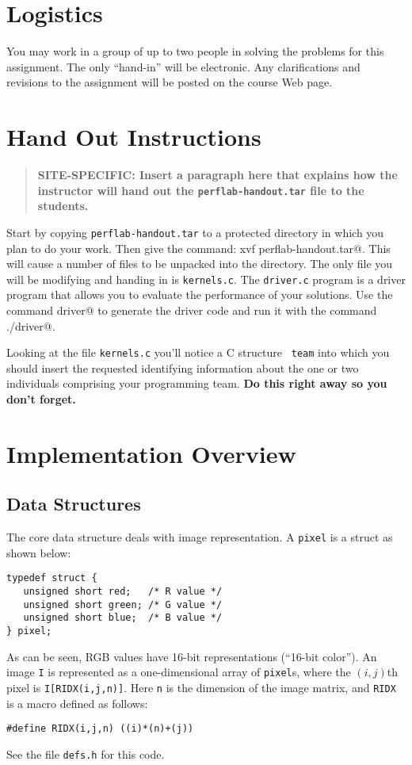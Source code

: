 \documentclass[11pt]{article}
\begin{document}
\section{Logistics}
You may work in a group of up to two people in solving the problems for
this assignment.  The only ``hand-in'' will be electronic.
Any clarifications and revisions to the assignment will be posted on
the course Web page.

\section{Hand Out Instructions} 

\begin{quote}
\bf SITE-SPECIFIC: Insert a paragraph here that explains how the instructor
will hand out the {\tt perflab-handout.tar} file to the students.
\end{quote}

Start by copying \texttt{perflab-handout.tar} to a protected directory
in which you plan to do your work.  Then give the command:
\verb@tar xvf perflab-handout.tar@.  This will cause a number of files
to be unpacked into the directory.  The only file you will be
modifying and handing in is {\tt kernels.c}.  The {\tt driver.c}
program is a driver program that allows you to evaluate the
performance of your solutions. Use the command \verb@make driver@ to
generate the driver code and run it with the command \verb@./driver@.

Looking at the file {\tt kernels.c} you'll notice a C structure {\tt
team} into which you should insert the requested identifying
information about the one or two individuals comprising your
programming team.  {\bf Do this right away so you don't forget.}  


\section{Implementation Overview}
\label{sec:overview}
\subsection*{Data Structures}
The core data structure deals with image representation. A {\tt pixel} is
a struct as shown below:
\small{\begin{verbatim}
typedef struct {
   unsigned short red;   /* R value */
   unsigned short green; /* G value */
   unsigned short blue;  /* B value */
} pixel;
\end{verbatim}}
As can be seen, RGB values have 16-bit representations (``16-bit color''). An image {\tt I} 
is represented
as a one-dimensional array of {\tt pixel}s, where the $(i,j)$th pixel
is {\tt I[RIDX(i,j,n)]}. Here {\tt n} is the dimension of the image
matrix, and {\tt RIDX} is a macro defined as follows:
\small{\begin{verbatim}
#define RIDX(i,j,n) ((i)*(n)+(j))
\end{verbatim}}
See the file {\tt defs.h} for this code.
\end{document}
